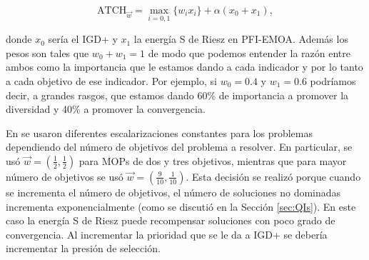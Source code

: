 \begin{equation} \label{eq:ATCH2}
    \text{ATCH}_{\vec{w}}=\max_{i=0,1} \{w_ix_i\}+\alpha (x_0+x_1),  
\end{equation}

donde $x_0$ sería el IGD+ y $x_1$ la energía S de Riesz en PFI-EMOA. Además los pesos son tales que $ w_0+w_1=1$ de modo que podemos entender la razón entre ambos como la importancia que le estamos dando a cada indicador y por lo tanto a cada objetivo de ese indicador. Por ejemplo, si $w_0=0.4$ y $w_1=0.6$ podríamos decir, a grandes rasgos, que estamos dando 60\% de importancia a promover la diversidad y 40\% a promover la convergencia.   

En \cite{PFI} se usaron diferentes escalarizaciones constantes para los problemas dependiendo del número de objetivos del problema a resolver. En particular, se usó $\vec{w}=(\frac{1}{2},\frac{1}{2})$ para MOPs de dos y tres objetivos, mientras que para mayor número de objetivos se usó $\vec{w}=(\frac{9}{10},\frac{1}{10})$. Esta decisión se realizó porque cuando se incrementa el número de objetivos, el número de soluciones no dominadas incrementa exponencialmente (como se discutió en la Sección \ref{sec:QIs}). En este caso la energía S de Riesz puede recompensar soluciones con poco grado de convergencia. Al incrementar la prioridad que se le da a IGD+ se debería incrementar la presión de selección. 

